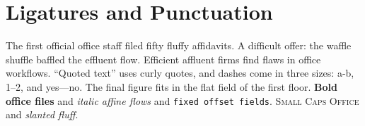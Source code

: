 \documentclass[12pt]{article}
\begin{document}
\section*{Ligatures and Punctuation}
The first official office staff filed fifty fluffy affidavits.
A difficult offer: the waffle shuffle baffled the effluent flow.
Efficient affluent firms find flaws in office workflows.
``Quoted text'' uses curly quotes, and dashes come in three sizes: a-b, 1--2, and yes---no.
The final figure fits in the flat field of the first floor.
\textbf{Bold office files} and \textit{italic affine flows} and \texttt{fixed offset fields}.
\textsc{Small Caps Office} and \textsl{slanted fluff}.
\end{document}
